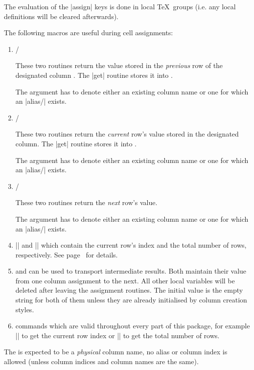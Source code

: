 \begin{command}{\pgfplotstablecreatecol{}}
The evaluation of the |assign| keys is done in local \TeX\ groups (i.e. any local definitions will be cleared afterwards).

The following macros are useful during cell assignments:
\begin{enumerate}
	\item \declareandlabel{\prevrow} / \declareandlabel{\getprevrow}

	These two routines return the value stored in the \emph{previous} row of the designated column . The |get| routine stores it into .

	The argument  has to denote either an existing column name or one for which an |alias/| exists.

	\item \declareandlabel{\thisrow} / \declareandlabel{\getthisrow}

	These two routines return the \emph{current} row's value stored in the designated column. The |get| routine stores it into .

	The argument  has to denote either an existing column name or one for which an |alias/| exists.

	\item \declareandlabel{\nextrow} / \declareandlabel{\getnextrow}

	These two routines return the \emph{next} row's value.

	The argument  has to denote either an existing column name or one for which an |alias/| exists.

	\item |\pgfplotstablerow| and |\pgfplotstablerows| which contain the current row's index and the total number of rows, respectively. See page~\pageref{pgfplotstable:page:tablerow} for details.
	\item \declareandlabel{\pgfmathaccuma} and \declareandlabel{\pgfmathaccumb} can be used to transport intermediate results.
	Both maintain their value from one column assignment to the next. All other local variables will be deleted after leaving the assignment routines. The initial value is the empty string for both of them unless they are already initialised by column creation styles.
	\item commands which are valid throughout every part of this package, for example |\pgfplotstablerow| to get the current row index or |\pgfplotstablerows| to get the total number of rows.
\end{enumerate}
The  is expected to be a \emph{physical} column name, no alias or column index is allowed (unless column indices and column names are the same).


\end{command}
